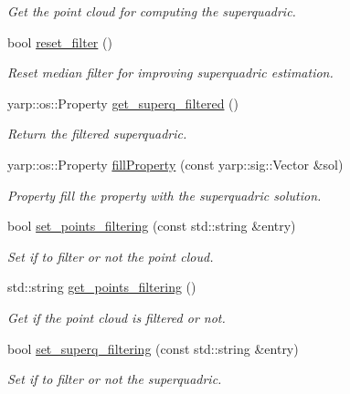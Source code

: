 \begin{DoxyCompactItemize}
\begin{DoxyCompactList}\small\item\em Get the point cloud for computing the superquadric. \end{DoxyCompactList}\item 
bool \mbox{\hyperlink{classSuperqModule_ae234e2b5b715e64ef928905964660122}{reset\+\_\+filter}} ()
\begin{DoxyCompactList}\small\item\em Reset median filter for improving superquadric estimation. \end{DoxyCompactList}\item 
yarp\+::os\+::\+Property \mbox{\hyperlink{classSuperqModule_aa6825617672381dcf3eb81dc643f0aaa}{get\+\_\+superq\+\_\+filtered}} ()
\begin{DoxyCompactList}\small\item\em Return the filtered superquadric. \end{DoxyCompactList}\item 
yarp\+::os\+::\+Property \mbox{\hyperlink{classSuperqModule_ae2935a960968a6354462a728e16d60b0}{fill\+Property}} (const yarp\+::sig\+::\+Vector \&sol)
\begin{DoxyCompactList}\small\item\em Property fill the property with the superquadric solution. \end{DoxyCompactList}\item 
bool \mbox{\hyperlink{classSuperqModule_a408203d0119443fb61544f84dafff8a4}{set\+\_\+points\+\_\+filtering}} (const std\+::string \&entry)
\begin{DoxyCompactList}\small\item\em Set if to filter or not the point cloud. \end{DoxyCompactList}\item 
std\+::string \mbox{\hyperlink{classSuperqModule_a60c8ff17436cc55a3e9b704dd6c2529b}{get\+\_\+points\+\_\+filtering}} ()
\begin{DoxyCompactList}\small\item\em Get if the point cloud is filtered or not. \end{DoxyCompactList}\item 
bool \mbox{\hyperlink{classSuperqModule_a902d4a48d1a919ff9d9b1f7d1c132577}{set\+\_\+superq\+\_\+filtering}} (const std\+::string \&entry)
\begin{DoxyCompactList}\small\item\em Set if to filter or not the superquadric. \end{DoxyCompactList}\item 

\end{DoxyCompactItemize}
